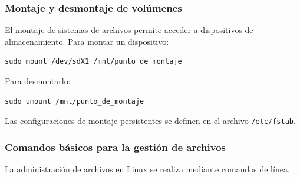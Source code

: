 \subsubsection{Montaje y desmontaje de volúmenes}

El montaje de sistemas de archivos permite acceder a dispositivos de almacenamiento. Para montar un dispositivo:

\begin{lstlisting}[style=mystyle]
sudo mount /dev/sdX1 /mnt/punto_de_montaje
\end{lstlisting}

Para desmontarlo:

\begin{lstlisting}[style=mystyle]
sudo umount /mnt/punto_de_montaje
\end{lstlisting}

Las configuraciones de montaje persistentes se definen en el archivo \texttt{/etc/fstab}.

\subsubsection{Comandos básicos para la gestión de archivos}

La administración de archivos en Linux se realiza mediante comandos de línea. 



